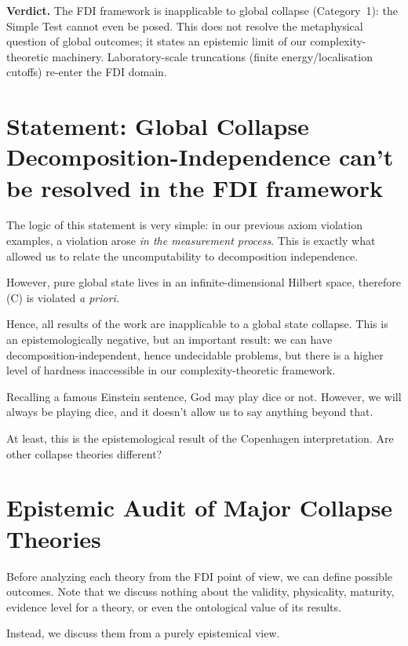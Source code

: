 \documentclass[12pt]{article}
\theoremstyle{definition}
\theoremstyle{plain}
\begin{document}
\medskip
\noindent
\textbf{Verdict.} The FDI framework is inapplicable to global collapse (Category~1): the Simple Test cannot even be posed. This does not resolve the metaphysical question of global outcomes; it states an epistemic limit of our complexity-theoretic machinery. Laboratory-scale truncations (finite energy/localisation cutoffs) re-enter the FDI domain.

\section{Statement: Global Collapse Decomposition-Independence can't be resolved in the FDI framework}

The logic of this statement is very simple: in our previous axiom violation examples, a violation arose \emph{in the measurement process}. This is exactly what allowed us to relate the uncomputability to decomposition independence.

However, pure global state lives in an infinite-dimensional Hilbert space, therefore (C) is violated \emph{a priori}.

Hence, all results of the work are inapplicable to a global state collapse. This is an epistemologically negative, but an important result: we can have decomposition-independent, hence undecidable problems, but there is a higher level of hardness inaccessible in our complexity-theoretic framework.

Recalling a famous Einstein sentence, God may play dice or not. However, we will always be playing dice, and it doesn't allow us to say anything beyond that.

At least, this is the epistemological result of the Copenhagen interpretation. Are other collapse theories different?

\section{Epistemic Audit of Major Collapse Theories}
\label{sec:fdi-audit-collapse}

Before analyzing each theory from the FDI point of view, we can define possible outcomes. Note that we discuss nothing about the validity, physicality, maturity, evidence level for a theory, or even the ontological value of its results. 

Instead, we discuss them from a purely epistemical view.
\end{document}
